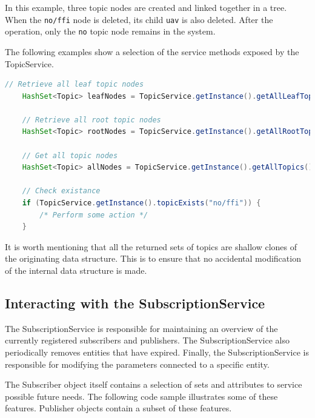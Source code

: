 In this example, three topic nodes are created and linked together in a tree. When the \verb!no/ffi! node is deleted, its child \verb!uav! is also deleted. After the operation, only the \verb!no! topic node remains in the system.

The following examples show a selection of the service methods exposed by the TopicService.

\begin{lstlisting}[language=Java, captionpos=b, caption=Additional TopicService methods, frame=bt, showstringspaces=false]
    // Retrieve all leaf topic nodes
    HashSet<Topic> leafNodes = TopicService.getInstance().getAllLeafTopics();
    
    // Retrieve all root topic nodes
    HashSet<Topic> rootNodes = TopicService.getInstance().getAllRootTopics();
    
    // Get all topic nodes
    HashSet<Topic> allNodes = TopicService.getInstance().getAllTopics();
    
    // Check existance
    if (TopicService.getInstance().topicExists("no/ffi")) {
        /* Perform some action */
    }
\end{lstlisting}

It is worth mentioning that all the returned sets of topics are shallow clones of the originating data structure. This is to ensure that no accidental modification of the internal data structure is made.

\subsection{Interacting with the SubscriptionService}
\label{subsec:components-interacting_with_the_subscriptionservice}

The SubscriptionService is responsible for maintaining an overview of the currently registered subscribers and publishers. The SubscriptionService also periodically removes entities that have expired. Finally, the SubscriptionService is responsible for modifying the parameters connected to a specific entity.

The Subscriber object itself contains a selection of sets and attributes to service possible future needs. The following code sample illustrates some of these features. Publisher objects contain a subset of these features.

